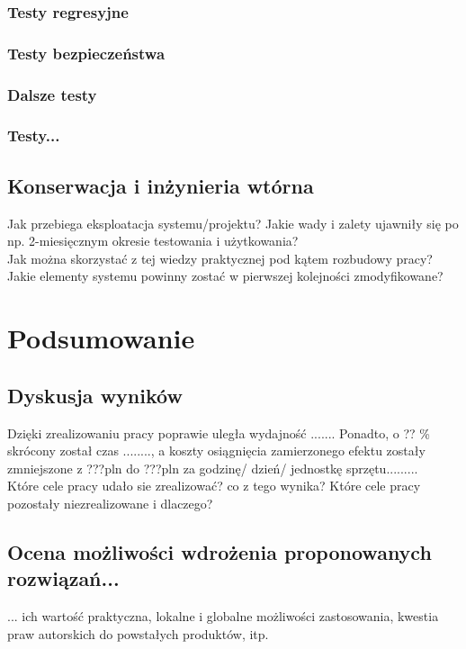 \documentclass[12pt]{report}
\begin{document}
\subsection{Testy regresyjne}
\subsection{Testy bezpieczeństwa}
\subsection{Dalsze testy}
\subsection{Testy...}

\section{Konserwacja i inżynieria wtórna}
Jak przebiega eksploatacja systemu/projektu? Jakie wady i zalety ujawniły się po
np. 2-miesięcznym okresie testowania i użytkowania? \\
\indent Jak można skorzystać z tej wiedzy praktycznej pod kątem roz\-bu\-do\-wy pracy? Jakie elementy systemu powinny zostać w pierwszej kolejności zmodyfikowane?  

\chapter{Podsumowanie}
\section{Dyskusja wyników}
Dzięki zrealizowaniu pracy poprawie uległa wydajność ....... Ponadto, o ?? \%
skrócony został czas ........, a koszty osiągnięcia zamierzonego efektu zostały
zmniejszone z ???pln do ???pln za godzinę/ dzień/ jednostkę sprzętu.........\\
\indent Które cele pracy udało sie zrealizować? co z tego wynika? Które cele
pracy pozostały niezrealizowane i dlaczego? 

\section[Ocena możliwości wdrożenia...]{Ocena możliwości wdrożenia proponowanych
\newline rozwiązań...}
... ich wartość praktyczna, lokalne i globalne możliwości zastosowania, kwestia
praw autorskich do powstałych produktów, itp. 
\end{document}
